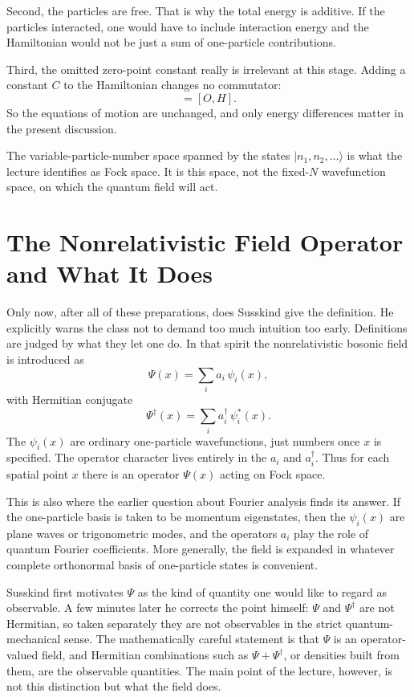 Second, the particles are free. That is why the total energy is additive. If the particles interacted, one would have to include interaction energy and the Hamiltonian would not be just a sum of one-particle contributions.

Third, the omitted zero-point constant really is irrelevant at this stage. Adding a constant \(C\) to the Hamiltonian changes no commutator:
\begin{equation}
[O,H+C]=[O,H].
\end{equation}
So the equations of motion are unchanged, and only energy differences matter in the present discussion.

The variable-particle-number space spanned by the states \(|n_1,n_2,\ldots\rangle\) is what the lecture identifies as Fock space. It is this space, not the fixed-\(N\) wavefunction space, on which the quantum field will act.

\section{The Nonrelativistic Field Operator and What It Does}

Only now, after all of these preparations, does Susskind give the definition. He explicitly warns the class not to demand too much intuition too early. Definitions are judged by what they let one do. In that spirit the nonrelativistic bosonic field is introduced as
\begin{equation}
\Psi(x)=\sum_i a_i\,\psi_i(x),
\end{equation}
with Hermitian conjugate
\begin{equation}
\Psi^\dagger(x)=\sum_i a_i^\dagger\,\psi_i^*(x).
\end{equation}
The \(\psi_i(x)\) are ordinary one-particle wavefunctions, just numbers once \(x\) is specified. The operator character lives entirely in the \(a_i\) and \(a_i^\dagger\). Thus for each spatial point \(x\) there is an operator \(\Psi(x)\) acting on Fock space.

This is also where the earlier question about Fourier analysis finds its answer. If the one-particle basis is taken to be momentum eigenstates, then the \(\psi_i(x)\) are plane waves or trigonometric modes, and the operators \(a_i\) play the role of quantum Fourier coefficients. More generally, the field is expanded in whatever complete orthonormal basis of one-particle states is convenient.

Susskind first motivates \(\Psi\) as the kind of quantity one would like to regard as observable. A few minutes later he corrects the point himself: \(\Psi\) and \(\Psi^\dagger\) are not Hermitian, so taken separately they are not observables in the strict quantum-mechanical sense. The mathematically careful statement is that \(\Psi\) is an operator-valued field, and Hermitian combinations such as \(\Psi+\Psi^\dagger\), or densities built from them, are the observable quantities. The main point of the lecture, however, is not this distinction but what the field does.


